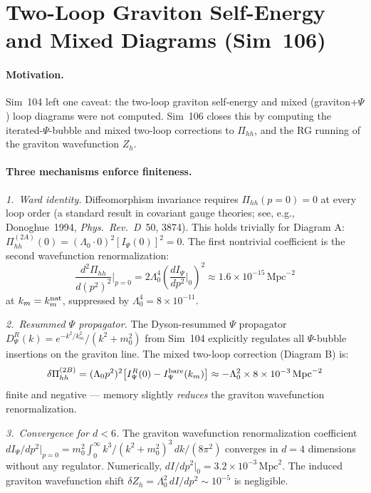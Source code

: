 \documentclass[12pt,a4paper]{article}
\begin{document}
\section{Two-Loop Graviton Self-Energy and Mixed Diagrams (Sim~106)}
\label{sec:sim106}

\paragraph{Motivation.}
Sim~104 left one caveat: the two-loop graviton self-energy and mixed
(graviton+$\Psi$) loop diagrams were not computed.
Sim~106 closes this by computing the iterated-$\Psi$-bubble and mixed
two-loop corrections to $\Pi_{hh}$, and the RG running of the
graviton wavefunction $Z_h$.

\paragraph{Three mechanisms enforce finiteness.}

\emph{1.~Ward identity.}
Diffeomorphism invariance requires $\Pi_{hh}(p=0)=0$ at every loop
order (a standard result in covariant gauge theories; see, e.g.,
Donoghue~1994, \textit{Phys.\ Rev.\ D}~50, 3874).
This holds trivially for Diagram A: $\Pi_{hh}^{(2A)}(0)\!=\!(\Lambda_0\cdot
0)^2[I_\Psi(0)]^2\!=\!0$.  The first nontrivial coefficient is the second
wavefunction renormalization:
\begin{equation}
\frac{d^2\Pi_{hh}}{d(p^2)^2}\bigg|_{p=0}
  = 2\Lambda_0^4\left(\frac{dI_\Psi}{dp^2}\bigg|_0\right)^{\!2}
  \approx 1.6\times10^{-15}\,\mathrm{Mpc}^{-2}
\end{equation}
at $k_m = k_m^{\rm nat}$, suppressed by $\Lambda_0^4 = 8\times10^{-11}$.

\emph{2.~Resummed $\Psi$ propagator.}
The Dyson-resummed $\Psi$ propagator
$D_\Psi^R(k)=e^{-k^2/k_m^2}/(k^2+m_0^2)$ from Sim~104 explicitly
regulates all $\Psi$-bubble insertions on the graviton line.
The mixed two-loop correction (Diagram B) is:
\begin{equation}
\delta\Pi_{hh}^{(2B)} = (\Lambda_0 p^2)^2\bigl[I_\Psi^R(0) - I_\Psi^{\rm bare}(k_m)\bigr]
  \approx -\Lambda_0^2\times 8\times10^{-3}\,\mathrm{Mpc}^{-2}
\end{equation}
finite and negative — memory slightly \emph{reduces} the graviton
wavefunction renormalization.

\emph{3.~Convergence for $d<6$.}
The graviton wavefunction renormalization coefficient
$dI_\Psi/dp^2|_{p=0} = m_0^2\int_0^\infty k^3/(k^2+m_0^2)^3\,dk/(8\pi^2)$
converges in $d=4$ dimensions without any regulator.
Numerically, $dI/dp^2|_0 = 3.2\times10^{-3}\,\mathrm{Mpc}^2$.
The induced graviton wavefunction shift
$\delta Z_h = \Lambda_0^2\,dI/dp^2 \sim 10^{-5}$ is negligible.
\end{document}
